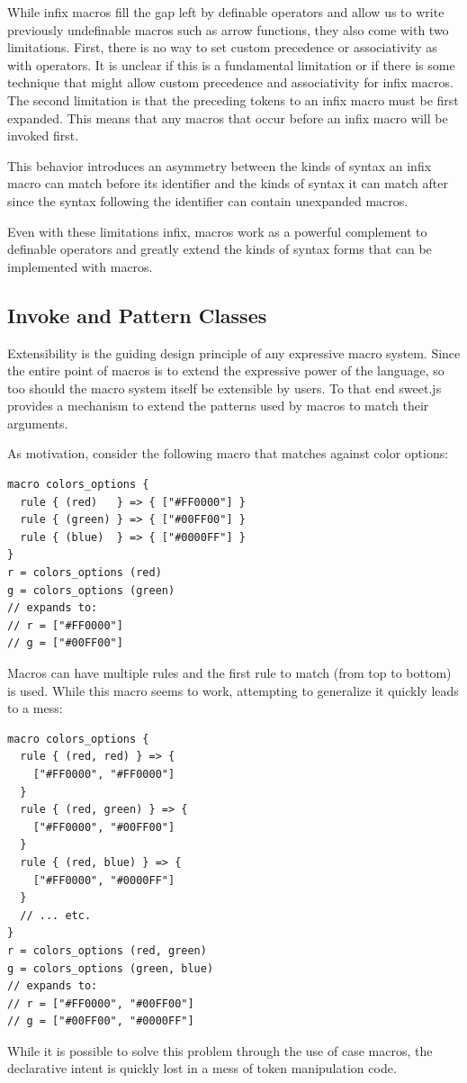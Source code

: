 \documentclass[preprint,10pt]{sigplanconf}
\begin{document}
While infix macros fill the gap left by definable operators and allow
us to write previously undefinable macros such as arrow functions,
they also come with two limitations. First, there is no way to set
custom precedence or associativity as with operators. It is unclear
if this is a fundamental limitation or if there is some technique that
might allow custom precedence and associativity for infix macros.
The second limitation is that the preceding tokens to an infix macro
must be first expanded. This means that any macros that occur before
an infix macro will be invoked first.

This behavior introduces an asymmetry between the kinds of syntax an
infix macro can match before its identifier and the kinds of syntax it
can match after since the syntax following the identifier can contain
unexpanded macros.

Even with these limitations infix, macros work as a powerful complement
to definable operators and greatly extend the kinds of syntax forms
that can be implemented with macros.

\subsection{Invoke and Pattern Classes}
\label{sec:invoke}

Extensibility is the guiding design principle of any expressive macro
system. Since the entire point of macros is to extend the expressive
power of the language, so too should the macro system itself be
extensible by users. To that end sweet.js provides a mechanism to
extend the patterns used by macros to match their arguments.

As motivation, consider the following macro that matches against
color options:
\begin{lstlisting}
macro colors_options {
  rule { (red)   } => { ["#FF0000"] }
  rule { (green) } => { ["#00FF00"] }
  rule { (blue)  } => { ["#0000FF"] }
}
r = colors_options (red)
g = colors_options (green)
// expands to:
// r = ["#FF0000"]
// g = ["#00FF00"]
\end{lstlisting}
Macros can have multiple rules and the first rule to match (from top
to bottom) is used. While this macro seems to work, attempting to
generalize it quickly leads to a mess:
\begin{lstlisting}
macro colors_options {
  rule { (red, red) } => {
    ["#FF0000", "#FF0000"]
  }
  rule { (red, green) } => {
    ["#FF0000", "#00FF00"]
  }
  rule { (red, blue) } => {
    ["#FF0000", "#0000FF"]
  }
  // ... etc.
}
r = colors_options (red, green)
g = colors_options (green, blue)
// expands to:
// r = ["#FF0000", "#00FF00"]
// g = ["#00FF00", "#0000FF"]
\end{lstlisting}
While it is possible to solve this problem through the use of case
macros, the declarative intent is quickly lost in a mess of 
token manipulation code.
\end{document}
